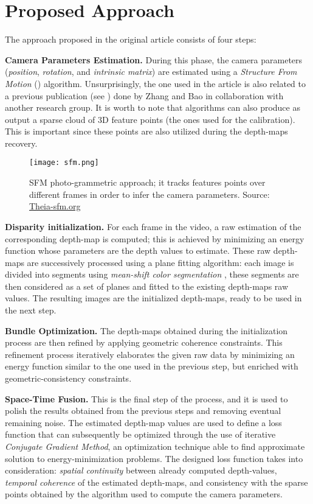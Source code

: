 \section{Proposed Approach}
The approach proposed in the original article consists of four steps:
\begin{description}
\item\textbf{Camera Parameters Estimation.} During this phase, the camera parameters (\ie \emph{position}, \emph{rotation}, and \emph{intrinsic matrix}) are estimated using a \emph{Structure From Motion} (\SFM) algorithm. Unsurprisingly, the one used in the article is also related to a previous publication (see \cite{Zhang2007}) done by Zhang and Bao in collaboration with another research group. It is worth to note that \SFM{} algorithms can also produce as output a sparse cloud of 3D feature points (the ones used for the calibration). This is important since these points are also utilized during the depth-maps recovery. 
\begin{figure}[!h]
	\centering
	\texttt{[image: sfm.png]} %
	\caption{SFM photo-grammetric approach; it tracks features points over different frames in order to infer the camera parameters. Source: \url{Theia-sfm.org}}
\end{figure}


\item\textbf{Disparity initialization.} 
For each frame in the video, a raw estimation of the corresponding depth-map is computed; this is achieved by minimizing an energy function whose parameters are the depth values to estimate.
These raw depth-maps are successively processed using a plane fitting algorithm: each image is divided into segments using \emph{mean-shift color segmentation} \cite{Comaniciu202}, these segments are then considered as a set of planes and fitted to the existing depth-maps raw values. The resulting images are the initialized depth-maps, ready to be used in the next step.

\item\textbf{Bundle Optimization.} The depth-maps obtained during the initialization process are then refined by applying geometric coherence constraints. This refinement process iteratively elaborates the given raw data by minimizing an energy function similar to the one used in the previous step, but enriched with geometric-consistency constraints.

\item\textbf{Space-Time Fusion.} This is the final step of the process, and it is used to polish the results obtained from the previous steps and removing eventual remaining noise.
The estimated depth-map values are used to define a loss function  that can subsequently be optimized through the use of iterative \emph{Conjugate Gradient Method}, an optimization technique able to find approximate solution to energy-minimization  problems.
The designed loss function takes into consideration: \emph{spatial continuity} between already computed depth-values, \emph{temporal coherence} of the estimated depth-maps, and consistency with the sparse points obtained by the \SFM{} algorithm used to compute the camera parameters.
\end{description}
 

